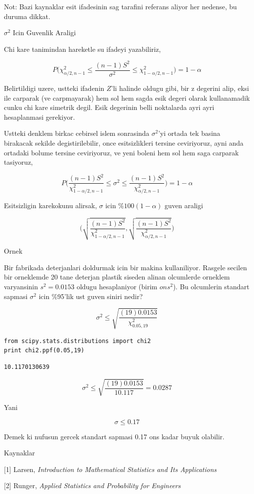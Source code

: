 \documentclass[12pt,fleqn]{article}\usepackage{../common}
\begin{document}
Not: Bazi kaynaklar esit ifadesinin sag tarafini referans aliyor her
nedense, bu duruma dikkat.

$\sigma^2$ Icin Guvenlik Araligi

Chi kare tanimindan hareketle su ifadeyi yazabiliriz, 

$$ P\bigg(
\chi_{\alpha/2,n-1}^2 \le
\frac{(n-1)S^2}{\sigma^2}  \le
\chi_{1-\alpha/2,n-1}^2
\bigg) = 1-\alpha
$$


Belirtildigi uzere, ustteki ifadenin $Z$'li halinde oldugu gibi, bir z
degerini alip, eksi ile carparak (ve carpmayarak) hem sol hem sagda esik
degeri olarak kullanamadik cunku chi kare simetrik degil. Esik degerinin
belli noktalarda ayri ayri hesaplanmasi gerekiyor.

Ustteki denklem birkac cebirsel islem sonrasinda $\sigma^2$'yi ortada tek
basina birakacak sekilde degistirilebilir, once esitsizlikleri tersine
ceviriyoruz, ayni anda ortadaki bolume tersine ceviriyoruz, ve yeni boleni
hem sol hem saga carparak tasiyoruz,

$$
P
\bigg(
\frac{(n-1)S^2}{\chi_{1-\alpha/2,n-1}^2} \le
\sigma^2  \le
\frac{(n-1)S^2}{\chi_{\alpha/2,n-1}^2} 
\bigg) = 1-\alpha
$$

Esitsizligin karekokunu alirsak, $\sigma$ icin $\%100(1-\alpha)$ guven
araligi


$$
\bigg(
\sqrt{\frac{(n-1)S^2}{\chi_{1-\alpha/2,n-1}^2}}
,
\sqrt{\frac{(n-1)S^2}{\chi_{\alpha/2,n-1}^2}}
\bigg) 
$$

Ornek

Bir fabrikada deterjanlari doldurmak icin bir makina kullaniliyor. Rasgele
secilen bir orneklemde 20 tane deterjan plastik siseden alinan olcumlerde
orneklem varyansinin $s^2 = 0.0153$ oldugu hesaplaniyor (birim $ons^2$). Bu
olcumlerin standart sapmasi $\sigma^2$ icin \%95'lik ust guven siniri nedir? 

$$ 
\sigma^2 \le
\sqrt{\frac{(19)0.0153}{\chi_{0.05,19}^2}}
 $$

\begin{verbatim}
from scipy.stats.distributions import chi2
print chi2.ppf(0.05,19)
\end{verbatim}

\begin{verbatim}
10.1170130639
\end{verbatim}

$$ 
\sigma^2 \le
\sqrt{\frac{(19)0.0153}{10.117}} = 0.0287
 $$

Yani

$$ \sigma \le 0.17 $$

Demek ki nufusun gercek standart sapmasi 0.17 ons kadar buyuk olabilir.

Kaynaklar

[1] Larsen, {\em Introduction to Mathematical Statistics and Its Applications}

[2] Runger, {\em Applied Statistics and Probability for Engineers}
\end{document}
